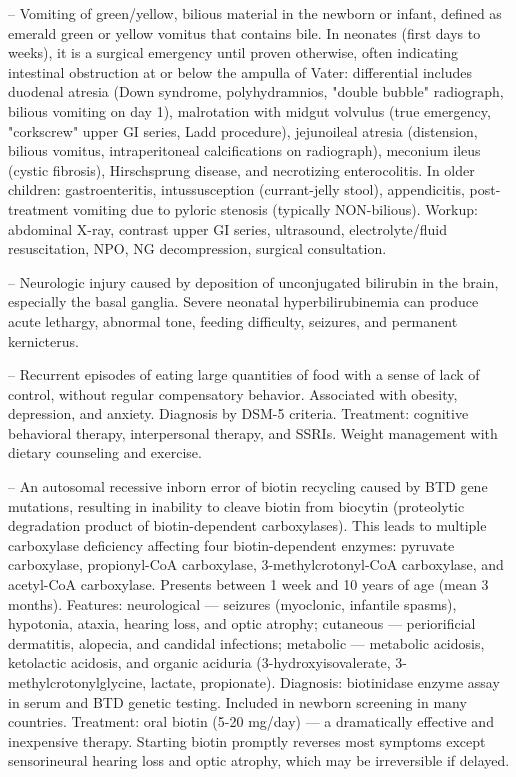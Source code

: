-- Vomiting of green/yellow, bilious material in the newborn or infant, defined as emerald green or yellow vomitus that contains bile. In neonates (first days to weeks), it is a surgical emergency until proven otherwise, often indicating intestinal obstruction at or below the ampulla of Vater: differential includes duodenal atresia (Down syndrome, polyhydramnios, "double bubble" radiograph, bilious vomiting on day 1), malrotation with midgut volvulus (true emergency, "corkscrew" upper GI series, Ladd procedure), jejunoileal atresia (distension, bilious vomitus, intraperitoneal calcifications on radiograph), meconium ileus (cystic fibrosis), Hirschsprung disease, and necrotizing enterocolitis. In older children: gastroenteritis, intussusception (currant-jelly stool), appendicitis, post-treatment vomiting due to pyloric stenosis (typically NON-bilious). Workup: abdominal X-ray, contrast upper GI series, ultrasound, electrolyte/fluid resuscitation, NPO, NG decompression, surgical consultation.

-- Neurologic injury caused by deposition of unconjugated bilirubin in the brain, especially the basal ganglia. Severe neonatal hyperbilirubinemia can produce acute lethargy, abnormal tone, feeding difficulty, seizures, and permanent kernicterus.

-- Recurrent episodes of eating large quantities of food with a sense of lack of control, without regular compensatory behavior. Associated with obesity, depression, and anxiety. Diagnosis by DSM-5 criteria. Treatment: cognitive behavioral therapy, interpersonal therapy, and SSRIs. Weight management with dietary counseling and exercise.

-- An autosomal recessive inborn error of biotin recycling caused by BTD gene mutations, resulting in inability to cleave biotin from biocytin (proteolytic degradation product of biotin-dependent carboxylases). This leads to multiple carboxylase deficiency affecting four biotin-dependent enzymes: pyruvate carboxylase, propionyl-CoA carboxylase, 3-methylcrotonyl-CoA carboxylase, and acetyl-CoA carboxylase. Presents between 1 week and 10 years of age (mean 3 months). Features: neurological — seizures (myoclonic, infantile spasms), hypotonia, ataxia, hearing loss, and optic atrophy; cutaneous — periorificial dermatitis, alopecia, and candidal infections; metabolic — metabolic acidosis, ketolactic acidosis, and organic aciduria (3-hydroxyisovalerate, 3-methylcrotonylglycine, lactate, propionate). Diagnosis: biotinidase enzyme assay in serum and BTD genetic testing. Included in newborn screening in many countries. Treatment: oral biotin (5-20 mg/day) — a dramatically effective and inexpensive therapy. Starting biotin promptly reverses most symptoms except sensorineural hearing loss and optic atrophy, which may be irreversible if delayed.

